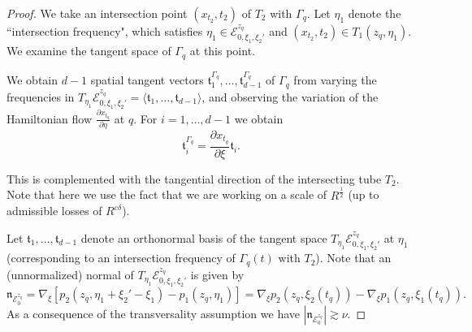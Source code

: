 \documentclass{amsart}
\theoremstyle{definition}
\begin{document}
\begin{proof}
We take an intersection point $(x_{t_2},t_2)$ of $T_{2}$ with $\Gamma_{q}$. Let $\eta_1$ denote the ``intersection frequency", which satisfies $\eta_1 \in \mathcal{E}^{z_q}_{0,\xi_1,\xi_2'}$ and $(x_{t_2},t_2) \in T_{1}(z_q,\eta_1).$ We examine the tangent space of $\Gamma_q$ at this point. 

We obtain $d-1$ spatial tangent vectors $ \mathfrak{t}_1^{\Gamma_q}, \ldots, \mathfrak{t}_{d-1}^{\Gamma_q} $ of $\Gamma_q$ from varying the frequencies in $T_{\eta_1} \mathcal{E}^{z_q}_{0,\xi_1,\xi_2'} = \langle \mathfrak{t}_1, \ldots, \mathfrak{t}_{d-1} \rangle$, and observing the variation of the Hamiltonian flow $\frac{\partial x_{t_q}}{\partial \eta}$ at $q$. For $i=1,\ldots,d-1$ we obtain
\begin{equation*}
\mathfrak{t}_i^{\Gamma_q} = \frac{\partial x_{t_q}}{\partial \xi} \mathfrak{t}_i.
\end{equation*}

This is complemented with the tangential direction of the intersecting tube $T_2$. Note that here we use the fact that we are working on a scale of $R^{\frac{1}{2}}$ (up to admissible losses of $R^{c \delta}$).

\medskip

Let $\mathfrak{t}_1,\ldots,\mathfrak{t}_{d-1}$ denote an orthonormal basis of the tangent space $T_{\eta_1} \mathcal{E}^{z_q}_{0,\xi_1,\xi_2'}$ at $\eta_1$ (corresponding to an intersection frequency of $\Gamma_{q}(t)$ with $T_{2}$). Note that an (unnormalized) normal of $T_{\eta_1} \mathcal{E}^{z_q}_{0,\xi_1,\xi_2'}$ is given by
\begin{equation*}
\mathfrak{n}_{\mathcal{E}^{z_q}_{0}} = \nabla_{\xi} [ p_2(z_q,\eta_1 + \xi_2' - \xi_1) - p_1(z_q,\eta_1)] = \nabla_{\xi} p_2(z_q,\xi_2(t_q)) - \nabla_{\xi} p_1(z_q,\xi_1(t_q)).
\end{equation*}
As a consequence of the transversality assumption we have $|\mathfrak{n}_{\mathcal{E}^{z_q}_{0}}| \gtrsim \nu$.

\smallskip


\end{proof}
\end{document}
